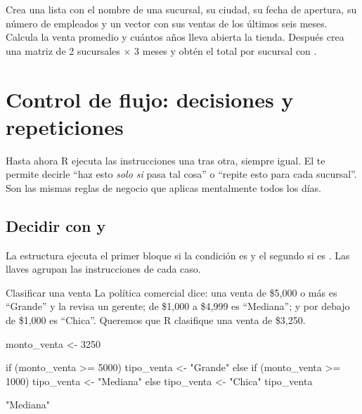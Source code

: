 \begin{hazlotu}
Crea una lista  con el nombre de una sucursal, su ciudad,
su fecha de apertura, su número de empleados y un vector con sus ventas de
los últimos seis meses. Calcula la venta promedio y cuántos años lleva
abierta la tienda. Después crea una matriz de 2 sucursales $\times$ 3 meses
y obtén el total por sucursal con .
\end{hazlotu}

\section{Control de flujo: decisiones y repeticiones}
\label{sec:m1-control}

Hasta ahora R ejecuta las instrucciones una tras otra, siempre igual. El
 te permite decirle ``haz esto \emph{solo si}
pasa tal cosa'' o ``repite esto para cada sucursal''. Son las mismas reglas
de negocio que aplicas mentalmente todos los días.

\subsection{Decidir con \texorpdfstring{}{if} y \texorpdfstring{}{else}}

La estructura 
ejecuta el primer bloque si la condición es  y el segundo si
es . Las llaves \codigo{\{ \}} agrupan las instrucciones de
cada caso.

\begin{ejemplo}{Clasificar una venta}
La política comercial dice: una venta de \$5,000 o más es ``Grande'' y la
revisa un gerente; de \$1,000 a \$4,999 es ``Mediana''; y por debajo de
\$1,000 es ``Chica''. Queremos que R clasifique una venta de \$3,250.
\end{ejemplo}

\begin{rcode}
monto_venta <- 3250

if (monto_venta >= 5000) {
  tipo_venta <- "Grande"
} else if (monto_venta >= 1000) {
  tipo_venta <- "Mediana"
} else {
  tipo_venta <- "Chica"
}
tipo_venta
\end{rcode}
\begin{rsalida}
[1] "Mediana"
\end{rsalida}

